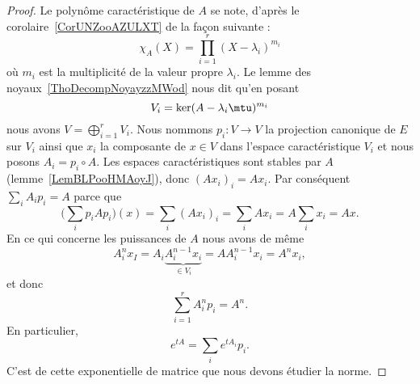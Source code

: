\begin{proof}
    Le polynôme caractéristique de \( A\) se note, d'après le corolaire~\ref{CorUNZooAZULXT} de la façon suivante :
    \begin{equation}
        \chi_A(X)=\prod_{i=1}^r(X-\lambda_i)^{m_i}
    \end{equation}
    où \( m_i\) est la multiplicité de la valeur propre \( \lambda_i\). Le lemme des noyaux~\ref{ThoDecompNoyayzzMWod} nous dit qu'en posant
    \begin{equation}
        V_i=\ker(A-\lambda_i\mtu)^{m_i}
    \end{equation}
    nous avons \( V=\bigoplus_{i=1}^rV_i\). Nous nommons \( p_i\colon V\to V\) la projection canonique de \( E\) sur \( V_i\) ainsi que \( x_i\) la composante de \( x\in V\) dans l'espace caractéristique \( V_i\) et nous posons \( A_i=p_i\circ A\). Les espaces caractéristiques sont stables par \( A\) (lemme~\ref{LemBLPooHMAoyJ}), donc \( (Ax_i)_i=Ax_i\). Par conséquent \( \sum_i A_ip_i=A\) parce que
    \begin{equation}
        \big( \sum_ip_iAp_i \big)(x)=\sum_i(Ax_i)_i=\sum_iAx_i=A\sum_ix_i=Ax.
    \end{equation}
    En ce qui concerne les puissances de \( A\) nous avons de même
    \begin{equation}
        A_i^nx_I=A_i\underbrace{A_i^{n-1}x_i}_{\in V_i}=AA_i^{n-1}x_i=A^nx_i,
    \end{equation}
    et donc
    \begin{equation}
        \sum_{i=1}^rA_i^np_i=A^n.
    \end{equation}
    En particulier,
    \begin{equation}    \label{EqPVIooGxwFBH}
        e^{tA}=\sum_i e^{tA_i}p_i.
    \end{equation}
    C'est de cette exponentielle de matrice que nous devons étudier la norme.


\end{proof}
